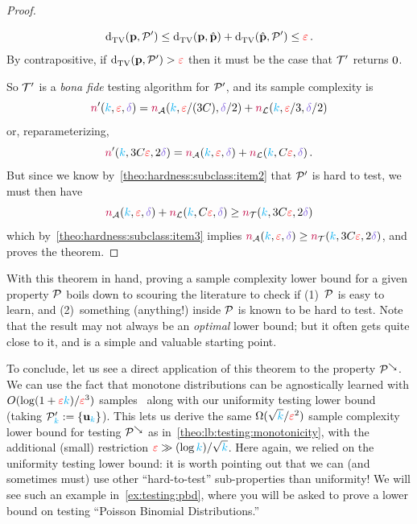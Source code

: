 \begin{proof}
\begin{itemize}
\[
	\totalvardist{\p}{\property'} \leq \totalvardist{\p}{\hat{\p}}+\totalvardist{\hat{\p}}{\property'} \leq \dst\,.
\]
By contrapositive, if $\totalvardist{\p}{\property'} > \dst$ then it must be the case that $\mathcal{T}'$ returns $0$.
\end{itemize}
So $\mathcal{T}'$ is a \textit{bona fide} testing algorithm for $\mathcal{P}'$, and its sample complexity is
\[
	\ns'(\ab,\dst,\errprob) = \ns_\Algo(\ab,\dst/(3C),\errprob/2) + \ns_{\mathcal{L}}(\ab,\dst/3,\errprob/2)
\]
or, reparameterizing, 
\[
	\ns'(\ab,3C\dst,2\errprob) = \ns_\Algo(\ab,\dst,\errprob) + \ns_{\mathcal{L}}(\ab,C\dst,\errprob)\,.
\]
But since we know by~\cref{theo:hardness:subclass:item2} that $\mathcal{P}'$ is hard to test, we must then have
\[
	\ns_\Algo(\ab,\dst,\errprob) + \ns_{\mathcal{L}}(\ab,C\dst,\errprob) \geq \ns_{\mathcal{T}}(\ab,3C\dst,2\errprob)
\]
which by~\cref{theo:hardness:subclass:item3} implies $\ns_\Algo(\ab,\dst,\errprob) \geq \ns_{\mathcal{T}}(\ab,3C\dst,2\errprob)$, and proves the theorem.
\end{proof}

With this theorem in hand, proving a sample complexity lower bound for a given property $\mathcal{P}$ boils down to scouring the literature to check if (1)~$\mathcal{P}$ is easy to learn, and (2)~something (anything!) inside $\mathcal{P}$ is known to be hard to test. Note that the result may not always be an \emph{optimal} lower bound; but it often gets quite close to it, and is a simple and valuable starting point.\smallskip

To conclude, let us see a direct application of this theorem to the property $\mathcal{P}^{\searrow}$. We can use the fact that monotone distributions can be agnostically learned with $O(\log(1+\textcolor{red}{\varepsilon}{\textcolor{cyan}{k}})/\textcolor{red}{\varepsilon}^3)$ samples~\citep{Birge87,DDS:12} along with our uniformity testing lower bound (taking $\mathcal{P}'_{\textcolor{cyan}{k}} := \{\mathbf{u}_{\textcolor{cyan}{k}}\}$). This lets us derive the same $\Omega(\sqrt{{\textcolor{cyan}{k}}}/\textcolor{red}{\varepsilon}^2)$ sample complexity lower bound for testing $\mathcal{P}^{\searrow}$ as in~\cref{theo:lb:testing:monotonicity}, with the additional (small) restriction $\textcolor{red}{\varepsilon} \gg (\log{\textcolor{cyan}{k}})/\sqrt{{\textcolor{cyan}{k}}}$. Here again, we relied on the uniformity testing lower bound: it is worth pointing out that we can (and sometimes must) use other ``hard-to-test'' sub-properties than uniformity! We will see such an example in~\cref{ex:testing:pbd}, where you will be asked to prove a lower bound on testing ``Poisson Binomial Distributions.''


